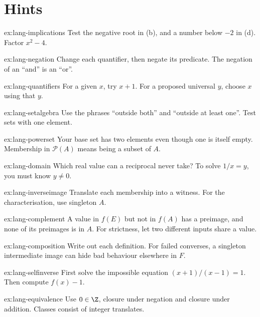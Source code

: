 \section{Hints}

\begin{hint}{ex:lang-implications}
Test the negative root in (b), and a number below $-2$ in (d). Factor $x^2-4$.
\end{hint}
\begin{hint}{ex:lang-negation}
Change each quantifier, then negate its predicate. The negation of an ``and'' is an ``or''.
\end{hint}
\begin{hint}{ex:lang-quantifiers}
For a given $x$, try $x+1$. For a proposed universal $y$, choose $x$ using that $y$.
\end{hint}
\begin{hint}{ex:lang-setalgebra}
Use the phrases ``outside both'' and ``outside at least one''. Test sets with one element.
\end{hint}
\begin{hint}{ex:lang-powerset}
Your base set has two elements even though one is itself empty. Membership in
$\mathcal P(A)$ means being a subset of $A$.
\end{hint}
\begin{hint}{ex:lang-domain}
Which real value can a reciprocal never take? To solve $1/x=y$, you must know $y\ne0$.
\end{hint}
\begin{hint}{ex:lang-inverseimage}
Translate each membership into a witness. For the characterisation, use singleton $A$.
\end{hint}
\begin{hint}{ex:lang-complement}
A value in $f(E)$ but not in $f(A)$ has a preimage, and none of its preimages is in $A$.
For strictness, let two different inputs share a value.
\end{hint}
\begin{hint}{ex:lang-composition}
Write out each definition. For failed converses, a singleton intermediate image can hide
bad behaviour elsewhere in $F$.
\end{hint}
\begin{hint}{ex:lang-selfinverse}
First solve the impossible equation $(x+1)/(x-1)=1$. Then compute $f(x)-1$.
\end{hint}
\begin{hint}{ex:lang-equivalence}
Use $0\in\Z$, closure under negation and closure under addition. Classes consist of
integer translates.
\end{hint}
